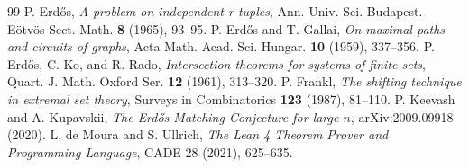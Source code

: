 \documentclass[11pt,a4paper]{article}
\theoremstyle{definition}
\begin{document}
\begin{thebibliography}{99}
 P. Erd\H{o}s, \textit{A problem on independent r-tuples}, Ann. Univ. Sci. Budapest. E\"otv\"os Sect. Math. \textbf{8} (1965), 93--95.
 P. Erd\H{o}s and T. Gallai, \textit{On maximal paths and circuits of graphs}, Acta Math. Acad. Sci. Hungar. \textbf{10} (1959), 337--356.
 P. Erd\H{o}s, C. Ko, and R. Rado, \textit{Intersection theorems for systems of finite sets}, Quart. J. Math. Oxford Ser. \textbf{12} (1961), 313--320.
 P. Frankl, \textit{The shifting technique in extremal set theory}, Surveys in Combinatorics \textbf{123} (1987), 81--110.
 P. Keevash and A. Kupavskii, \textit{The Erd\H{o}s Matching Conjecture for large $n$}, arXiv:2009.09918 (2020).
 L. de Moura and S. Ullrich, \textit{The Lean 4 Theorem Prover and Programming Language}, CADE 28 (2021), 625--635.
\end{thebibliography}
\end{document}
